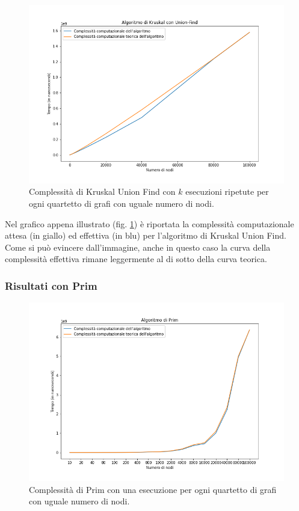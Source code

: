 \begin{figure}[H]
	\centering
	\includegraphics[width=1\textwidth]{res/images/graph-complexity/kruskal_union_find.png}
	\caption{Complessità di Kruskal Union Find con \(k\) esecuzioni ripetute per ogni quartetto di grafi con uguale numero di nodi.}
	\label{fig:kruskal_uf}
\end{figure}

Nel grafico appena illustrato (fig. \ref{fig:kruskal_uf}) è riportata la complessità computazionale attesa (in giallo) ed effettiva (in blu) per l'algoritmo di Kruskal Union Find.
Come si può evincere dall'immagine, anche in questo caso la curva della complessità effettiva rimane leggermente al di sotto della curva teorica.


\subsubsection{Risultati con Prim}

\begin{figure}[H]
	\centering
	\includegraphics[width=1\textwidth]{res/images/graph-no-rep/prim_senza_ripetizioni.png}
    \caption{Complessità di Prim con una esecuzione per ogni quartetto di grafi con uguale numero di nodi.}
	\label{fig:primnr}
\end{figure}

